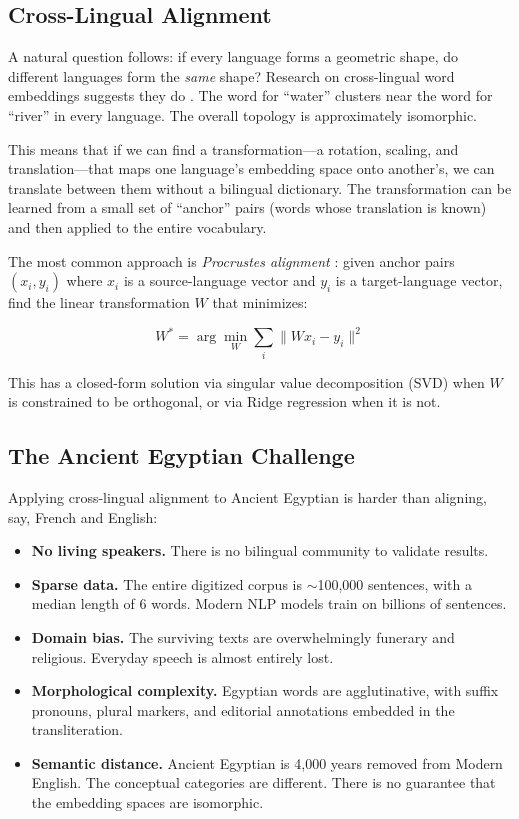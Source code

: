 \documentclass[11pt, a4paper]{article}
\begin{document}
\subsection{Cross-Lingual Alignment}

A natural question follows: if every language forms a geometric shape, do different languages form the \textit{same} shape? Research on cross-lingual word embeddings suggests they do \citep{conneau2018word, lample2018word}. The word for ``water'' clusters near the word for ``river'' in every language. The overall topology is approximately isomorphic.

This means that if we can find a transformation---a rotation, scaling, and translation---that maps one language's embedding space onto another's, we can translate between them without a bilingual dictionary. The transformation can be learned from a small set of ``anchor'' pairs (words whose translation is known) and then applied to the entire vocabulary.

The most common approach is \textit{Procrustes alignment} \citep{schonemann1966generalized}: given anchor pairs $(x_i, y_i)$ where $x_i$ is a source-language vector and $y_i$ is a target-language vector, find the linear transformation $W$ that minimizes:

\begin{equation}
    W^* = \arg\min_W \sum_{i} \| Wx_i - y_i \|^2
\end{equation}

This has a closed-form solution via singular value decomposition (SVD) when $W$ is constrained to be orthogonal, or via Ridge regression when it is not.

\subsection{The Ancient Egyptian Challenge}

Applying cross-lingual alignment to Ancient Egyptian is harder than aligning, say, French and English:

\begin{itemize}[nosep]
    \item \textbf{No living speakers.} There is no bilingual community to validate results.
    \item \textbf{Sparse data.} The entire digitized corpus is $\sim$100,000 sentences, with a median length of 6 words. Modern NLP models train on billions of sentences.
    \item \textbf{Domain bias.} The surviving texts are overwhelmingly funerary and religious. Everyday speech is almost entirely lost.
    \item \textbf{Morphological complexity.} Egyptian words are agglutinative, with suffix pronouns, plural markers, and editorial annotations embedded in the transliteration.
    \item \textbf{Semantic distance.} Ancient Egyptian is 4,000 years removed from Modern English. The conceptual categories are different. There is no guarantee that the embedding spaces are isomorphic.
\end{itemize}
\end{document}
